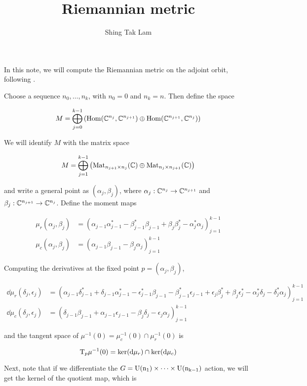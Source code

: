 \documentclass{article}
\title{Riemannian metric}
\author{Shing Tak Lam}
\begin{document}
\maketitle

In this note, we will compute the Riemannian metric on the adjoint orbit, following \cite{kobak_classical_1996}.

Choose a sequence \(n_0, \dots, n_k\), with \(n_0 = 0\) and \(n_k = n\). Then define the space

\[M = \bigoplus_{j=0}^{k-1}\left(\operatorname{Hom}(\mathbb{C}^{n_j}, \mathbb{C}^{n_{j+1}}) \oplus \operatorname{Hom}(\mathbb{C}^{n_{j+1}}, \mathbb{C}^{n_j})\right)\]

We will identify \(M\) with the matrix space

\[M = \bigoplus_{j=1}^{k-1}\left(\operatorname{Mat}_{n_{j+1} \times n_j}(\mathbb{C}) \oplus \operatorname{Mat}_{n_j \times n_{j+1}}(\mathbb{C})\right)\]

and write a general point as \((\alpha_j, \beta_j)\), where \(\alpha_j : \mathbb{C}^{n_j} \to \mathbb{C}^{n_{j+1}}\) and \(\beta_j : \mathbb{C}^{n_{j+1}} \to \mathbb{C}^{n_j}\). Define the moment maps

\begin{align*}
    \mu_r(\alpha_j, \beta_j) &= (\alpha_{j-1}\alpha_{j-1}^* - \beta_{j-1}^*\beta_{j-1}+\beta_j\beta_j^* - \alpha_j^*\alpha_j)_{j=1}^{k-1} \\
    \mu_c(\alpha_j, \beta_j) &= (\alpha_{j-1}\beta_{j-1} - \beta_j\alpha_j)_{j=1}^{k-1}
\end{align*}

Computing the derivatives at the fixed point \(p = (\alpha_j, \beta_j)\),

\begin{align*}
    \dd\mu_r(\delta_j, \epsilon_j) &= \left(\alpha_{j-1}\delta_{j-1}^* + \delta_{j-1}\alpha_{j-1}^* - \epsilon_{j-1}^*\beta_{j-1} - \beta_{j-1}^*\epsilon_{j-1} + \epsilon_j\beta_j^* + \beta_j\epsilon_j^* - \alpha_j^*\delta_j - \delta_j^*\alpha_j\right)_{j=1}^{k-1} \\
    \dd\mu_c(\delta_j, \epsilon_j) &= \left(\delta_{j-1}\beta_{j-1} + \alpha_{j-1}\epsilon_{j-1} - \beta_j\delta_j - \epsilon_j\alpha_j\right)_{j=1}^{k-1}
\end{align*}

and the tangent space of \(\mu^{-1}(0) = \mu_c^{-1}(0) \cap \mu_r^{-1}(0)\) is

\[\mathrm{T}_p\mu^{-1}(0) = \ker(\dd\mu_r) \cap \ker(\dd\mu_c)\]

Next, note that if we differentiate the \(G = \rm U(n_1) \times \cdots \times \rm U(n_{k-1})\) action, we will get the kernel of the quotient map, which is
\end{document}
